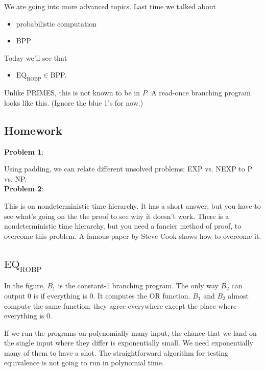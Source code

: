 
We are going into more advanced topics. Last time we talked about 
\begin{itemize}
\item
probabilistic computation
\item
BPP
\end{itemize}
Today we'll see that
\begin{itemize}
\item
$\text{EQ}_{\text{ROBP}}\in $BPP.
\end{itemize}
Unlike PRIMES, this is not known to be in $P$. A read-once branching program looks like this. (Ignore the blue 1's for now.)


\subsection*{Homework}
\textbf{Problem 1}:

Using padding, we can relate different unsolved problems: EXP vs. NEXP to P vs. NP.\\

\noindent
\textbf{Problem 2}:

This is on nondeterministic time hierarchy. It has a short answer, but you have to see what's going on the the proof to see why it doesn't work. There is a nondeterministic time hierarchy, but you need a fancier method of proof, to overcome this problem.  %
A famous paper by Steve Cook shows how to overcome it.

\subsection{$\text{EQ}_{\text{ROBP}}$}

In the figure, $B_1$ is the constant-1 branching program. The only way $B_2$ can output 0 is if everything is 0.
It computes the OR function. $B_1$ and $B_2$ almost compute the same function; they agree everywhere except the place where everything is 0.


If we run the programs on polynomially many input, the chance that we land on the single input where they differ is exponentially small. We need exponentially many of them to have a shot. The straightforward algorithm for testing equivalence is not going to run in polynomial time. 

